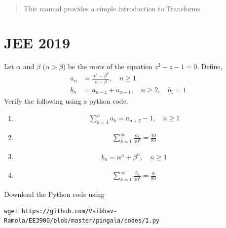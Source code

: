 \documentclass[journal,12pt,twocolumn]{IEEEtran}
\renewcommand\thesection{\arabic{section}}
\begin{document}
% 







\maketitle


\tableofcontents

\bigskip

\begin{abstract}
This manual provides a simple introduction to Transforms
\end{abstract}
\section{JEE 2019}
\noindent Let $\alpha$ and $\beta$ ($\alpha > \beta$) be the roots of the
equation $z^2 - z - 1 = 0$. Define,
\begin{align}
a_n &= \frac{\alpha^{n}-\beta^{n}}{\alpha - \beta}, \quad n \ge 1
\\
b_n &= a_{n-1} + a_{n+1}, \quad n \ge 2, \quad b_1 =1
\label{eq:10-orig-diff}
\end{align}
Verify the following using a python code.
\begin{enumerate}[label=\thesection.\arabic*
,ref=\thesection.\theenumi]
\item 
\begin{align}
	\sum_{k=1}^{n}a_k = a_{n+2}-1, \quad n \ge 1
\end{align}
\item 
\begin{align}
	\sum_{k=1}^{\infty}\frac{a_k}{10^k} =\frac{10}{89}
\end{align}
\item 
\begin{align}
	b_n =\alpha^n + \beta^n, \quad n \ge 1
\end{align}
\item 
\begin{align}
	\sum_{k=1}^{\infty}\frac{b_k}{10^k} =\frac{8}{89}
\end{align}
\end{enumerate}
Download the Python code using
\begin{lstlisting}
wget https://github.com/Vaibhav-Ramola/EE3900/blob/master/pingala/codes/1.py
\end{lstlisting}
\end{document}
